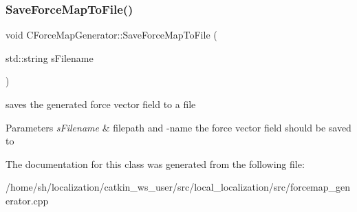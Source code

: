 \subsubsection{\texorpdfstring{Save\+Force\+Map\+To\+File()}{SaveForceMapToFile()}}
{\footnotesize\ttfamily void C\+Force\+Map\+Generator\+::\+Save\+Force\+Map\+To\+File (\begin{DoxyParamCaption}\item[{std\+::string}]{s\+Filename }\end{DoxyParamCaption})\hspace{0.3cm}{\ttfamily [inline]}}

saves the generated force vector field to a file 
\begin{DoxyParams}{Parameters}
{\em s\+Filename} & filepath and -\/name the force vector field should be saved to \\
\hline
\end{DoxyParams}


The documentation for this class was generated from the following file\+:\begin{DoxyCompactItemize}
\item 
/home/sh/localization/catkin\+\_\+ws\+\_\+user/src/local\+\_\+localization/src/forcemap\+\_\+generator.\+cpp\end{DoxyCompactItemize}
